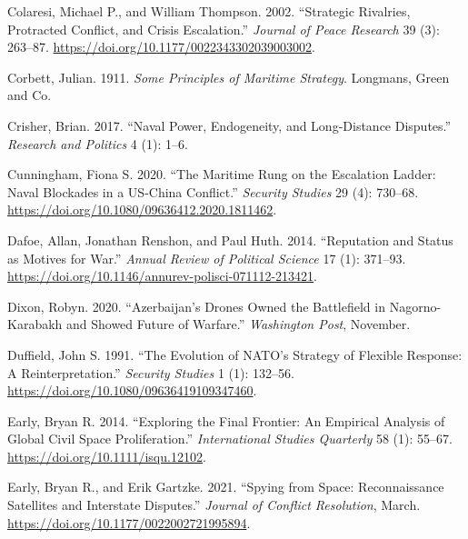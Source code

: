 \documentclass[
]{article}
\begin{document}
\leavevmode\hypertarget{ref-colaresi_strategicrivalriesprotracted_2002}{}%
Colaresi, Michael P., and William Thompson. 2002. ``Strategic Rivalries, Protracted Conflict, and Crisis Escalation.'' \emph{Journal of Peace Research} 39 (3): 263--87. \url{https://doi.org/10.1177/0022343302039003002}.

\leavevmode\hypertarget{ref-corbett_principlesmaritimestrategy_1911}{}%
Corbett, Julian. 1911. \emph{Some Principles of Maritime Strategy}. Longmans, Green and Co.

\leavevmode\hypertarget{ref-crisher_navalpowerendogeneity_2017}{}%
Crisher, Brian. 2017. ``Naval Power, Endogeneity, and Long-Distance Disputes.'' \emph{Research and Politics} 4 (1): 1--6.

\leavevmode\hypertarget{ref-cunningham_maritimerungescalation_2020}{}%
Cunningham, Fiona S. 2020. ``The Maritime Rung on the Escalation Ladder: Naval Blockades in a US-China Conflict.'' \emph{Security Studies} 29 (4): 730--68. \url{https://doi.org/10.1080/09636412.2020.1811462}.

\leavevmode\hypertarget{ref-dafoe_reputationstatusmotives_2014}{}%
Dafoe, Allan, Jonathan Renshon, and Paul Huth. 2014. ``Reputation and Status as Motives for War.'' \emph{Annual Review of Political Science} 17 (1): 371--93. \url{https://doi.org/10.1146/annurev-polisci-071112-213421}.

\leavevmode\hypertarget{ref-dixon_azerbaijandronesowned_2020}{}%
Dixon, Robyn. 2020. ``Azerbaijan's Drones Owned the Battlefield in Nagorno-Karabakh and Showed Future of Warfare.'' \emph{Washington Post}, November.

\leavevmode\hypertarget{ref-duffield_evolutionnatostrategy_1991}{}%
Duffield, John S. 1991. ``The Evolution of NATO's Strategy of Flexible Response: A Reinterpretation.'' \emph{Security Studies} 1 (1): 132--56. \url{https://doi.org/10.1080/09636419109347460}.

\leavevmode\hypertarget{ref-early_exploringfinalfrontier_2014}{}%
Early, Bryan R. 2014. ``Exploring the Final Frontier: An Empirical Analysis of Global Civil Space Proliferation.'' \emph{International Studies Quarterly} 58 (1): 55--67. \url{https://doi.org/10.1111/isqu.12102}.

\leavevmode\hypertarget{ref-early_spyingspacereconnaissance_2021}{}%
Early, Bryan R., and Erik Gartzke. 2021. ``Spying from Space: Reconnaissance Satellites and Interstate Disputes.'' \emph{Journal of Conflict Resolution}, March. \url{https://doi.org/10.1177/0022002721995894}.
\end{document}
